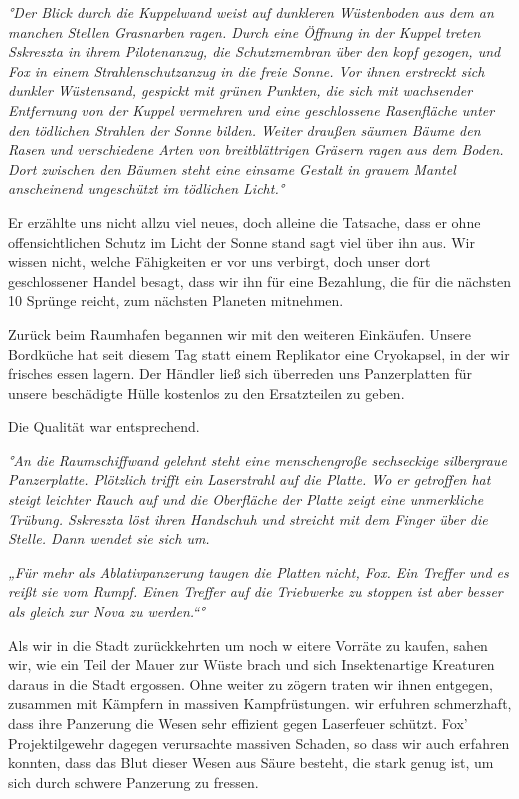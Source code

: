 \documentclass[11pt]{article}
\begin{document}
\emph{°Der Blick durch die Kuppelwand weist auf dunkleren Wüstenboden
aus dem an manchen Stellen Grasnarben ragen. Durch eine Öffnung in der
Kuppel treten Sskreszta in ihrem Pilotenanzug, die Schutzmembran über
den kopf gezogen, und Fox in einem Strahlenschutzanzug in die freie
Sonne. Vor ihnen erstreckt sich dunkler Wüstensand, gespickt mit grünen
Punkten, die sich mit wachsender Entfernung von der Kuppel vermehren und
eine geschlossene Rasenfläche unter den tödlichen Strahlen der Sonne
bilden. Weiter draußen säumen Bäume den Rasen und verschiedene Arten von
breitblättrigen Gräsern ragen aus dem Boden. Dort zwischen den Bäumen
steht eine einsame Gestalt in grauem Mantel anscheinend ungeschützt im
tödlichen Licht.°}

Er erzählte uns nicht allzu viel neues, doch alleine die Tatsache, dass
er ohne offensichtlichen Schutz im Licht der Sonne stand sagt viel über
ihn aus. Wir wissen nicht, welche Fähigkeiten er vor uns verbirgt, doch
unser dort geschlossener Handel besagt, dass wir ihn für eine Bezahlung,
die für die nächsten 10 Sprünge reicht, zum nächsten Planeten mitnehmen.

Zurück beim Raumhafen begannen wir mit den weiteren Einkäufen. Unsere
Bordküche hat seit diesem Tag statt einem Replikator eine Cryokapsel, in
der wir frisches essen lagern. Der Händler ließ sich überreden uns
Panzerplatten für unsere beschädigte Hülle kostenlos zu den Ersatzteilen
zu geben.

Die Qualität war entsprechend.

\emph{°An die Raumschiffwand gelehnt steht eine menschengroße
sechseckige silbergraue Panzerplatte. Plötzlich trifft ein Laserstrahl
auf die Platte. Wo er getroffen hat steigt leichter Rauch auf und die
Oberfläche der Platte zeigt eine unmerkliche Trübung. Sskreszta löst
ihren Handschuh und streicht mit dem Finger über die Stelle. Dann wendet
sie sich um.}

\emph{„Für mehr als Ablativpanzerung taugen die Platten nicht, Fox. Ein
Treffer und es reißt sie vom Rumpf. Einen Treffer auf die Triebwerke zu
stoppen ist aber besser als gleich zur Nova zu werden.``°}

Als wir in die Stadt zurückkehrten um noch w eitere Vorräte zu kaufen,
sahen wir, wie ein Teil der Mauer zur Wüste brach und sich
Insektenartige Kreaturen daraus in die Stadt ergossen. Ohne weiter zu
zögern traten wir ihnen entgegen, zusammen mit Kämpfern in massiven
Kampfrüstungen. wir erfuhren schmerzhaft, dass ihre Panzerung die Wesen
sehr effizient gegen Laserfeuer schützt. Fox' Projektilgewehr dagegen
verursachte massiven Schaden, so dass wir auch erfahren konnten, dass
das Blut dieser Wesen aus Säure besteht, die stark genug ist, um sich
durch schwere Panzerung zu fressen.
\end{document}
